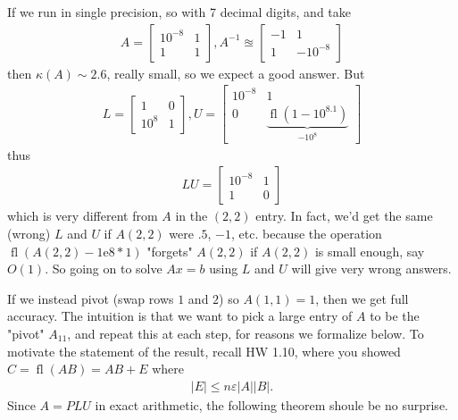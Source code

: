 \documentclass[11pt]{article}
\numberwithin{equation}{section}
\begin{document}
\begin{example}
    If we run in single precision, so with 7 decimal digits, and take \begin{align*}
        A=\left[\begin{array}{cc}
            10^{-8} & 1 \\
            1 & 1
            \end{array}\right], A^{-1} \approxeq \left[\begin{array}{cc}
            -1 & 1 \\
            1 & -10^{-8}
            \end{array}\right]
    \end{align*}
    then $\kappa(A) \sim 2.6$, really small, so we expect a good answer. But \begin{align*}
        L=\left[\begin{array}{ll}
            1 & 0 \\
            10^{8} & 1
            \end{array}\right], U=\left[\begin{array}{ll}
            10^{-8} & 1 \\
            0 & \underbrace{\operatorname{fl}\left(1-10^{8.1}\right)}_{-10^{8}}
            \end{array}\right]
    \end{align*}
    thus \begin{align*}
        L U =\left[\begin{array}{ll}
            10^{-8} & 1 \\
            1 & 0
            \end{array}\right]
    \end{align*}
    which is very different from $A$ in the $(2,2)$ entry. In fact, we'd get the same (wrong) $L$ and $U$ if $A(2,2)$ were $.5$, $-1$, etc. 
    because the operation $\operatorname{fl}(A(2,2)-1\mathrm{e}8*1)$ "forgets" $A(2,2)$ if $A(2,2)$ is small enough, say $O(1)$. 
    So going on to solve $Ax=b$ using $L$ and $U$ will give very wrong answers.

    If we instead pivot (swap rows $1$ and $2$) so $A(1,1)=1$, then we get full accuracy. The intuition is that we want to pick a large entry of $A$ to
    be the "pivot" $A_{11}$, and repeat this at each step, for reasons we formalize below. To motivate the statement of the result, 
    recall HW 1.10, where you showed $C = \operatorname{fl}(AB) = AB + E$ where \begin{align*}
        |E| \leq n \varepsilon |A||B|.
    \end{align*}
    Since $A =PLU$ in exact arithmetic, the following theorem shoule be no surprise.
\end{example}
\end{document}
